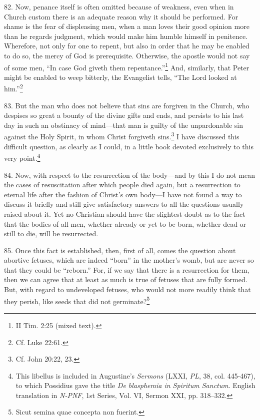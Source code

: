 82. Now, penance itself is often omitted because of weakness, even when in Church custom there is an adequate reason why it should be performed. For shame is the fear of displeasing men, when a man loves their good opinion more than he regards judgment, which would make him humble himself in penitence. Wherefore, not only for one to repent, but also in order that he may be enabled to do so, the mercy of God is prerequisite. Otherwise, the apostle would not say of some men, ``In case God giveth them repentance.''\footnote{II Tim. 2:25 (mixed text).} And, similarly, that Peter might be enabled to weep bitterly, the Evangelist tells, ``The Lord looked at him.''\footnote{Cf. Luke 22:61.}

83. But the man who does not believe that sins are forgiven in the Church, who despises so great a bounty of the divine gifts and ends, and persists to his last day in such an obstinacy of mind—that man is guilty of the unpardonable sin against the Holy Spirit, in whom Christ forgiveth sins.\footnote{Cf. John 20:22, 23.} I have discussed this difficult question, as clearly as I could, in a little book devoted exclusively to this very point.\footnote{This libellus is included in Augustine's \emph{Sermons} (LXXI, \emph{PL}, 38, col. 445-467), to which Possidius gave the title \emph{De blasphemia in Spiritum Sanctum}. English translation in \emph{N-PNF}, 1st Series, Vol. VI, Sermon XXI, pp. 318–332.}


84. Now, with respect to the resurrection of the body—and by this I do not mean the cases of resuscitation after which people died again, but a resurrection to eternal life after the fashion of Christ's own body—I have not found a way to discuss it briefly and still give satisfactory answers to all the questions usually raised about it. Yet no Christian should have the slightest doubt as to the fact that the bodies of all men, whether already or yet to be born, whether dead or still to die, will be resurrected.

85. Once this fact is established, then, first of all, comes the question about abortive fetuses, which are indeed ``born'' in the mother's womb, but are never so that they could be ``reborn.'' For, if we say that there is a resurrection for them, then we can agree that at least as much is true of fetuses that are fully formed. But, with regard to undeveloped fetuses, who would not more readily think that they perish, like seeds that did not germinate?\footnote{Sicut semina quae concepta non fuerint.}

